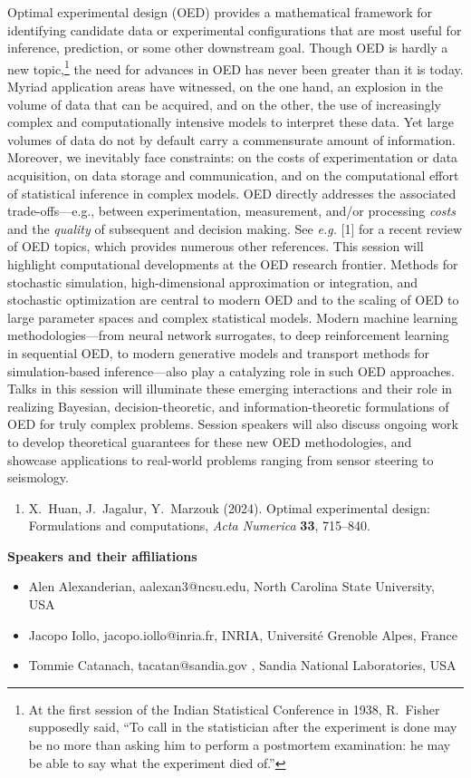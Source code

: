 \begin{session}
 Optimal experimental design (OED) provides a mathematical framework for identifying candidate data or experimental configurations that are most useful for inference, prediction, or some other downstream goal. Though OED is hardly a new topic,\footnote{At the first session of the Indian Statistical Conference in 1938, R.\ Fisher supposedly said, ``To call in the statistician after the experiment is done may be no more than asking him to perform a postmortem examination: he may be able to say what the experiment died of.''} the need for advances in OED has never been greater than it is today. Myriad application areas have witnessed, on the one hand, an explosion in the volume of data that can be acquired, and on the other, the use of increasingly complex and computationally intensive models to interpret these data. Yet large volumes of data do not by default carry a commensurate amount of information. Moreover, we inevitably face constraints: on the costs of experimentation or data acquisition, on data storage and communication, and on the computational effort of statistical inference in complex models. OED directly addresses the associated trade-offs---e.g., between experimentation, measurement, and/or processing \textit{costs} and
 the \textit{quality} of subsequent and decision making. See {\it e.g.} [1] for a recent review of OED topics, which provides numerous other references.
 This session will highlight computational developments at the OED research frontier. Methods for stochastic simulation, high-dimensional approximation or integration, and stochastic optimization are central to modern OED and to the scaling of OED to large parameter spaces and complex statistical models. Modern machine learning methodologies---from neural network surrogates, to deep reinforcement learning in sequential OED, to modern generative models and transport methods for simulation-based inference---also play a catalyzing role in such OED approaches. Talks in this session will illuminate these emerging interactions and their role in realizing Bayesian, decision-theoretic, and information-theoretic formulations of OED for truly complex problems. Session speakers will also discuss ongoing work to develop theoretical guarantees for these new OED methodologies, and showcase applications to real-world problems ranging from sensor steering to seismology.
 \medskip
 \begin{enumerate}
 \item[{[1]}] X.\ Huan, J.\ Jagalur, Y.\ Marzouk (2024). Optimal experimental design: Formulations and computations, \textit{Acta Numerica} \textbf{33}, 715--840.
 \end{enumerate}
 \textbf{Speakers and their affiliations}
 \begin{itemize}
 \item Alen Alexanderian,  aalexan3@ncsu.edu, North Carolina State University, USA
 \item Jacopo Iollo, jacopo.iollo@inria.fr, INRIA, Universit\'e Grenoble Alpes, France
 \item Tommie Catanach, tacatan@sandia.gov , Sandia National Laboratories, USA
 \end{itemize}
\end{session}

